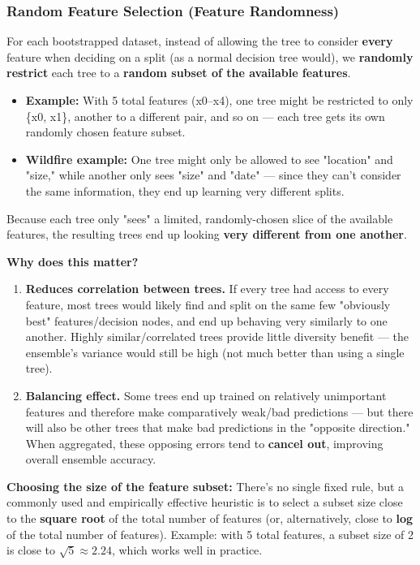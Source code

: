 \documentclass[12pt,openany]{book}
\begin{document}
\subsubsection{Random Feature Selection (Feature Randomness)}


For each bootstrapped dataset, instead of allowing the tree to consider \textbf{every} feature when deciding on a split (as a normal decision tree would), we \textbf{randomly restrict} each tree to a \textbf{random subset of the available features}.

\begin{itemize}[leftmargin=*]
    \item \textbf{Example:} With 5 total features (x0--x4), one tree might be restricted to only \{x0, x1\}, another to a different pair, and so on --- each tree gets its own randomly chosen feature subset.
    \item \textbf{Wildfire example:} One tree might only be allowed to see "location" and "size," while another only sees "size" and "date" --- since they can't consider the same information, they end up learning very different splits.

\end{itemize}

Because each tree only "sees" a limited, randomly-chosen slice of the available features, the resulting trees end up looking \textbf{very different from one another}.

\textbf{Why does this matter?}
\begin{enumerate}[leftmargin=*]
    \item \textbf{Reduces correlation between trees.} If every tree had access to every feature, most trees would likely find and split on the same few "obviously best" features/decision nodes, and end up behaving very similarly to one another. Highly similar/correlated trees provide little diversity benefit --- the ensemble's variance would still be high (not much better than using a single tree).
    \item \textbf{Balancing effect.} Some trees end up trained on relatively unimportant features and therefore make comparatively weak/bad predictions --- but there will also be other trees that make bad predictions in the "opposite direction." When aggregated, these opposing errors tend to \textbf{cancel out}, improving overall ensemble accuracy.

\end{enumerate}

\textbf{Choosing the size of the feature subset:} There's no single fixed rule, but a commonly used and empirically effective heuristic is to select a subset size close to the \textbf{square root} of the total number of features (or, alternatively, close to \textbf{log} of the total number of features). Example: with 5 total features, a subset size of 2 is close to \(\sqrt{5} \approx 2.24\), which works well in practice.
\end{document}
